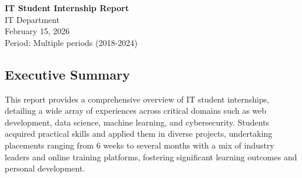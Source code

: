 \documentclass[11pt,a4paper]{article}
\newcommand{\InstituteName}{IT Department}
\newcommand{\ReportTitle}{IT Student Internship Report}
\newcommand{\ReportDate}{February 15, 2026}
\newenvironment{card}{
    \begin{tcolorbox}[
        enhanced,
        colback=cardback,
        colframe=border,
        sharp corners,
        boxrule=0.5pt,
        drop shadow,
        drop shadow={shadow xshift=1mm,shadow yshift=-1mm,fill=border!50},
        boxsep=3mm,
        left=5mm, right=5mm, top=5mm, bottom=5mm,
        width=\textwidth,
        nobeforeafter
    ]
}{\end{tcolorbox}}
\begin{document}
\thispagestyle{empty}
\vspace*{2cm}
\begin{center}
    {\Huge\textcolor{accent}{\textbf{\ReportTitle}}}\\
    \vspace{1cm}
    {\large\textcolor{muted}{\InstituteName}}\\
    {\large\textcolor{muted}{\ReportDate}}\\
    \vspace{0.5cm}
    {\small\textcolor{muted}{Period: Multiple periods (2018-2024)}}
\end{center}

\vspace{2cm}

\begin{card}
    \subsection*{\textcolor{accent}{Executive Summary}}
    \vspace{0.3cm}
    This report provides a comprehensive overview of IT student internships, detailing a wide array of experiences across critical domains such as web development, data science, machine learning, and cybersecurity. Students acquired practical skills and applied them in diverse projects, undertaking placements ranging from 6 weeks to several months with a mix of industry leaders and online training platforms, fostering significant learning outcomes and personal development.
\end{card}

\vspace{1cm}
\end{document}
